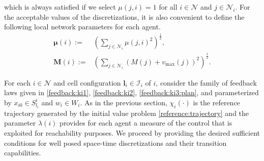 \documentclass[reqno]{amsart}
\theoremstyle{plain}
\theoremstyle{definition}
\numberwithin{equation}{section}
\begin{document}
\noindent which is always satisfied if we select $\mu(j,i)=1$ for all $i\in{\ensuremath{\mathcal{N}}}$ and $j\in{\ensuremath{\mathcal{N}}}_i$. For the acceptable values of the discretizations, it is also convenient to define the following local network parameters for each agent.
\begin{align}
{\ensuremath{\boldsymbol{{\mu}}}}(i):= & \left(\sum_{j\in{\ensuremath{\mathcal{N}}}_i}\mu(j,i)^2\right)^{\frac{1}{2}}, \\
{\textbf{{M}}}(i):= &  \left(\sum_{j\in{\ensuremath{\mathcal{N}}}_i}(M(j)+v_{\max}(j))^2\right)^{\frac{1}{2}}.
\end{align}

\noindent For each $i\in{\ensuremath{\mathcal{N}}}$ and cell configuration ${\textbf{{l}}}_i\in{\ensuremath{\boldsymbol{\mathcal{I}}}}_i$ of $i$, consider the family of feedback laws given in \eqref{feedback:ki1}, \eqref{feedback:ki2}, \eqref{feedback:ki3:plan}, and parameterized by $x_{i0}\in S_{l_i}^i$ and $w_i\in W_i$. As in the previous section, $\chi_i(\cdot)$ is the reference trajectory generated by the initial value problem \eqref{reference:trajectory} and the parameter $\lambda(i)$ provides for each agent a measure of the control that is exploited for reachability purposes. We proceed by providing the desired sufficient conditions for well posed space-time discretizations and their transition capabilities.
\end{document}
